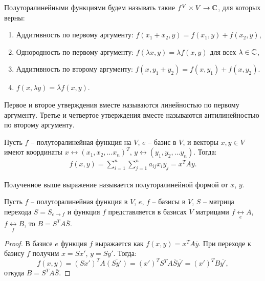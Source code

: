 \begin{definition}
    Полуторалинейными функциями будем называть такие $f^ V \times V \to \mathbb{C}$, для которых верны: 
    \begin{enumerate}
        \item Аддитивность по первому аргументу: $f(x_1 + x_2, y) = f(x_1, y) + f(x_2, y)$,
        \item Однородность по первому аргументу: $f(\lambda x, y) = \lambda f(x, y)$ для всех $\lambda \in \mathbb{C}$,
        \item Аддитивность по второму аргументу: $f(x, y_1 + y_2) = f(x, y_1) + f(x, y_2)$.
        \item $f(x, \lambda y) = \overline{\lambda} f(x, y)$.
    \end{enumerate}
\end{definition}

\begin{note}
    Первое и второе утверждения вместе называются линейностью по первому аргументу.
    Третье и четвертое утверждения вместе называются антилинейностью по второму аргументу.
\end{note}

\begin{proposition}
    Пусть $f$ -- полуторалинейная функция на $V$, $e$ -- базис в $V$, и векторы $x, y \in V$ имеют 
    координаты $x \leftrightarrow (x_1, x_2, \dots x_n)^T$, $y \leftrightarrow (y_1, y_2, \dots y_n)$.
    Тогда: \begin{gather*}
        f(x, y) = \sum_{i=1}^{n} \sum_{j=1}^{n} a_{ij} x_i \overline{y_j} = x^T A \overline{y}.
    \end{gather*} 
\end{proposition}

\begin{definition}
    Полученное выше выражение называется полуторалинейной формой от $x$, $y$.
\end{definition}

\begin{proposition}
    Пусть $f$ -- полуторалинейная функция в $V$, $e$, $f$ -- базисы в $V$, $S$ -- матрица перехода 
    $S = S_{e \to f}$ и функция $f$ представляется в базисах $V$ матрицами
    $f \underset{e}{\leftrightarrow} A$, $f  \underset{f}{\leftrightarrow} B$, то $B = S^T A \overline{S}$.
\end{proposition}

\begin{proof}
    В базисе $e$ функция $f$ выражается как $f(x, y) = x^T A \overline{y}$. При переходе к базису 
    $f$ получим $x = S x'$, $y =  S y'$. Тогда:
    $$f(x, y) = (Sx')^T A \overline{(Sy')} = (x')^T S^TA \overline{S} \overline{y'} = (x')^TB\overline{y'},$$
    откуда $B = S^TA\overline{S}$.
\end{proof}

